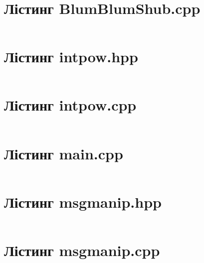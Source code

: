 \documentclass[a4paper,oneside,titlepage,14pt]{extarticle}
\begin{document}
\begin{appendices}
		\section{Лістинг BlumBlumShub.cpp}
			\inputminted[tabsize=4,breaklines,breakbytokenanywhere,breaksymbol={},style=bw]{cpp}{source-codes/BlumBlumShub.cpp}
		\newpage
		\section{Лістинг intpow.hpp}
			\inputminted[tabsize=4,breaklines,breakbytokenanywhere,breaksymbol={},style=bw]{cpp}{source-codes/intpow.h}
		\newpage
		\section{Лістинг intpow.cpp}
			\inputminted[tabsize=4,breaklines,breakbytokenanywhere,breaksymbol={},style=bw]{cpp}{source-codes/intpow.cpp}
		\newpage
		\section{Лістинг main.cpp}
			\inputminted[tabsize=4,breaklines,breakbytokenanywhere,breaksymbol={},style=bw]{cpp}{source-codes/main.cpp}
		\newpage
		\section{Лістинг msgmanip.hpp}
			\inputminted[tabsize=4,breaklines,breakbytokenanywhere,breaksymbol={},style=bw]{cpp}{source-codes/msgmanip.hpp}
		\newpage
		\section{Лістинг msgmanip.cpp}
			\inputminted[tabsize=4,breaklines,breakbytokenanywhere,breaksymbol={},style=bw]{cpp}{source-codes/msgmanip.cpp}
		\newpage
		
	\end{appendices}
\end{document}
